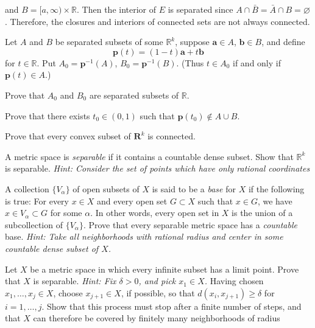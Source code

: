 \begin{exercise}
  [a,\infty)\times\mathbb{R}\).
  Let \(A = (-\infty,-a]\times{}\) and
  \(B = [a,\infty)\times\mathbb{R}\).
  Then the interior of \(E\) is separated since
  \(A\cap\bar{B} = \bar{A}\cap B = \varnothing\).
  Therefore, the closures and interiors of connected sets are not always
  connected.
\item
  Let \(A\) and \(B\) be separated subsets of some \(\mathbb{R}^k\), suppose
  \(\mathbold{a}\in A\), \(\mathbold{b}\in B\), and define
  \[
  \mathbold{p}(t) = (1 - t)\mathbold{a} + t\mathbold{b}
  \]
  for \(t\in\mathbb{R}\).
  Put \(A_0 = \mathbold{p}^{-1}(A)\), \(B_0 = \mathbold{p}^{-1}(B)\).
  (Thus \(t\in A_0\) if and only if \(\mathbold{p}(t)\in A\).)
  \begin{exercise}[label = (\alph*)]
  \item
    Prove that \(A_0\) and \(B_0\) are separated subsets of \(\mathbb{R}\).
  \item
    Prove that there exists \(t_0\in (0, 1)\) such that
    \(\mathbold{p}(t_0)\not\in A\cup B\).
  \item
    Prove that every convex subset of \(\mathbold{R}^k\) is connected.
  \end{exercise}
\item
  \label{2.22}
  A metric space is \textit{separable} if it contains a countable dense subset.
  Show that \(\mathbb{R}^k\) is separable.
  \textit{Hint: Consider the set of points which have only rational
    coordinates}
\item
  \label{2.23}
  A collection \(\{V_{\alpha}\}\) of open subsets of \(X\) is said to be a
  \textit{base} for \(X\) if the following is true: For every \(x\in X\) and
  every open set \(G\subset X\) such that \(x\in G\), we have
  \(x\in V_{\alpha}\subset G\) for some \(\alpha\).
  In other words, every open set in \(X\) is the union of a subcollection of
  \(\{V_{\alpha}\}\).
  Prove that every separable metric space has a \textit{countable} base.
  \textit{Hint: Take all neighborhoods with rational radius and center in some
    countable dense subset of \(X\).}
\item
  \label{2.24}
  Let \(X\) be a metric space in which every infinite subset has a limit point.
  Prove that \(X\) is separable.
  \textit{Hint: Fix \(\delta > 0\), and pick \(x_1\in X\).}
  Having chosen \(x_1,\ldots,x_j\in X\), choose \(x_{j + 1}\in X\), if
  possible, so that \(d(x_i, x_{j + 1})\geq\delta\) for \(i = 1,\ldots,j\).
  Show that this process must stop after a finite number of steps, and that
  \(X\) can therefore be covered by finitely many neighborhoods of radius

\end{exercise}
